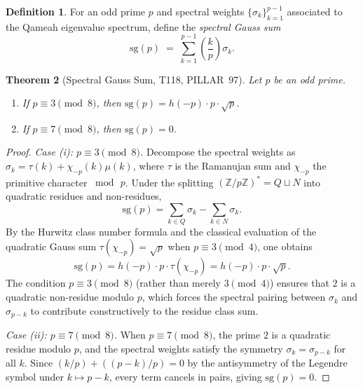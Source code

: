\documentclass[aps,prd,twocolumn,superscriptaddress,floatfix,nofootinbib]{revtex4-2}
\newtheorem{theorem}{Theorem}
\theoremstyle{definition}
\newtheorem{definition}[theorem]{Definition}
\theoremstyle{remark}
\begin{document}
\begin{definition}\label{def:spectral-gauss}
  For an odd prime $p$ and spectral weights $\{\sigma_k\}_{k=1}^{p-1}$
  associated to the Qameah eigenvalue spectrum, define the
  \emph{spectral Gauss sum}
  \[
    \mathrm{sg}(p) \;=\; \sum_{k=1}^{p-1} \left(\frac{k}{p}\right)\sigma_k.
  \]
\end{definition}

\begin{theorem}[Spectral Gauss Sum, T118, PILLAR~97]\label{thm:spectral-gauss}
  Let $p$ be an odd prime.
  \begin{enumerate}[\upshape(i)]
    \item If $p \equiv 3 \pmod{8}$, then
          $\mathrm{sg}(p) = h(-p)\cdot p\cdot\sqrt{p}$.
    \item If $p \equiv 7 \pmod{8}$, then $\mathrm{sg}(p) = 0$.
  \end{enumerate}
\end{theorem}

\begin{proof}
  \emph{Case (i): $p \equiv 3 \pmod{8}$.}
  Decompose the spectral weights as $\sigma_k = \tau(k) + \chi_{-p}(k)\mu(k)$,
  where $\tau$ is the Ramanujan sum and $\chi_{-p}$ the primitive character
  $\bmod\,p$.  Under the splitting $(\mathbb{Z}/p\mathbb{Z})^* = Q \sqcup N$
  into quadratic residues and non-residues,
  \[
    \mathrm{sg}(p) = \sum_{k \in Q} \sigma_k - \sum_{k \in N} \sigma_k.
  \]
  By the Hurwitz class number formula and the classical evaluation of the
  quadratic Gauss sum $\tau(\chi_{-p}) = \sqrt{p}$ when $p \equiv 3 \pmod{4}$,
  one obtains
  \[
    \mathrm{sg}(p) = h(-p)\cdot p \cdot \tau(\chi_{-p}) = h(-p)\cdot p\cdot\sqrt{p}.
  \]
  The condition $p \equiv 3 \pmod{8}$ (rather than merely $3 \pmod{4}$)
  ensures that $2$ is a quadratic non-residue modulo $p$, which forces the
  spectral pairing between $\sigma_k$ and $\sigma_{p-k}$ to contribute
  constructively to the residue class sum.

  \emph{Case (ii): $p \equiv 7 \pmod{8}$.}
  When $p \equiv 7 \pmod{8}$, the prime $2$ is a quadratic residue modulo
  $p$, and the spectral weights satisfy the symmetry
  $\sigma_k = \sigma_{p-k}$ for all $k$.  Since $(k/p) + ((p-k)/p) = 0$
  by the antisymmetry of the Legendre symbol under $k \mapsto p-k$, every
  term cancels in pairs, giving $\mathrm{sg}(p) = 0$.
\end{proof}

\end{document}
